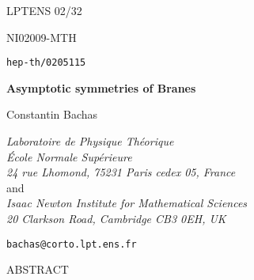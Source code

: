 \documentclass[a4paper,12pt,oneside]{article}
\begin{document}
\thispagestyle{empty}
\setcounter{page}{0}
\renewcommand{\theequation}{\thesection.\arabic{equation}}


\def\a{{\alpha}}
\def\ap{{\a}^{\prime}}
\def\b{{\beta}}
\def\d{{\delta}}
\def\g{{\gamma}}
\def\e{{\epsilon}}
\def\z{{\zeta}}
\def\ve{{\varepsilon}}
\def\vf{{\varphi}}
\def\m\mu
\def\n{{\nu}}
\def\u{{\Upsilon}}
\def\l{{\lambda}}
\def\s{{\sigma}}
\def\t{{\tau}}
\def\th{{\theta}}
\def\vt{{\vartheta}}
\def\nc{noncommutative\ }
\def\npt{non-perturbative\ }
\def\hp{\hat\partial}
\def\kk{{\kappa}}
\def\IR{{\bf R}}
\def\CM{{\cal M}}



{\hfill{LPTENS 02/32}}

{\hfill{NI02009-MTH}}

{\hfill{\tt hep-th/0205115}}

\vspace{2cm}

\begin{center}
{\bf Asymptotic symmetries of \coordHE{} Branes}

\vspace{1.4cm}

Constantin Bachas

\vspace{.2cm}

{\em Laboratoire de Physique Th\'eorique}\\
{\em \'Ecole Normale Sup\'erieure}\\
{\em 24 rue Lhomond, 75231 Paris cedex 05, France} \\
\vspace{.2cm}
{ and} \\
\vspace{.2cm}
{ \em Isaac Newton Institute for Mathematical Sciences
} \\
{ \em 20 Clarkson Road, Cambridge CB3 0EH, UK } \\
\end{center}

\vspace{-.1cm}

\centerline{{\tt bachas@corto.lpt.ens.fr}}

\vspace{1cm}

\centerline{ABSTRACT}

\vspace{- 4 mm}
\end{document}
